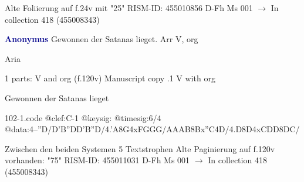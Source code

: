 \documentclass[twocolumn]{book}
\begin{document}
\newline Alte Foliierung auf f.24v mit "25"
\newline RISM-ID: 455010856
\newline D-Fh  Ms 001
\newline $\rightarrow$ In collection 418 (455008343)
      
\newline \par \vspace{7pt} \textcolor{darkblue}{\textbf{Anonymus  }}
\newline Gewonnen der Satanas lieget. Arr
\newline V, org
\newline \begin{itshape}[f.120v, heading:] Aria\end{itshape} 
\newline \textcolor{darkblue}{}  1 parts: V and org  (f.120v)
\newline Manuscript copy
.1  V with org
\newline \begin{footnotesize} Gewonnen der Satanas lieget \end{footnotesize}  
\begin{filecontents*}{102-1.code}
@clef:C-1
@keysig:
@timesig:6/4
@data:4--''D/D'B''DD'B''D/4.'A8G4xFGGG/AAAB{8Bx''C}4D/4.D8D4xCDD{8DC}/
\end{filecontents*}
\newline
%

\newline Zwischen den beiden Systemen 5 Textstrophen
\newline Alte Paginierung auf f.120v vorhanden: "75"
\newline RISM-ID: 455011031
\newline D-Fh  Ms 001
\newline $\rightarrow$ In collection 418 (455008343)
      
\end{document}
